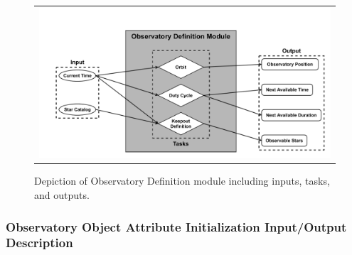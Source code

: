 \documentclass[cleanfoot]{asme2ej}
\begin{document}
\begin{figure}[ht]
    \begin{center}
        \begin{tabular}{c}
             \includegraphics[width=\textwidth]{observatory2}
        \end{tabular}
    \end{center}
    \caption{\label{fig:observatory} Depiction of Observatory Definition module including inputs, tasks, and outputs.}
\end{figure}

\label{sec:observatorydefinition}
\subsubsection{Observatory Object Attribute Initialization Input/Output Description}
\end{document}
